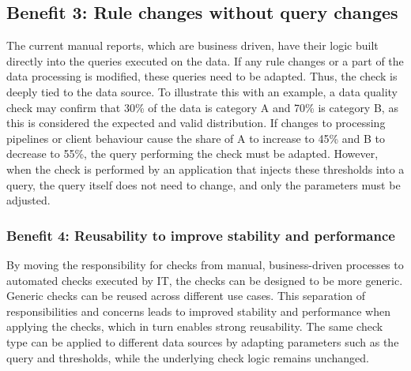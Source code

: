 \subsection*{Benefit 3: Rule changes without query changes}
The current manual reports, which are business driven, have their logic built directly into the queries executed on the data. If any rule changes or a part of the data processing is modified, these queries need to be adapted. Thus, the check is deeply tied to the data source. To illustrate this with an example, a data quality check may confirm that 30\% of the data is category A and 70\% is category B, as this is considered the expected and valid distribution. If changes to processing pipelines or client behaviour cause the share of A to increase to 45\% and B to decrease to 55\%, the query performing the check must be adapted. However, when the check is performed by an application that injects these thresholds into a query, the query itself does not need to change, and only the parameters must be adjusted.

\subsubsection*{Benefit 4:  Reusability to improve stability and performance}
By moving the responsibility for checks from manual, business-driven processes to automated checks executed by IT, the checks can be designed to be more generic. Generic checks can be reused across different use cases. This separation of responsibilities and concerns leads to improved stability and performance when applying the checks, which in turn enables strong reusability. The same check type can be applied to different data sources by adapting parameters such as the query and thresholds, while the underlying check logic remains unchanged.

